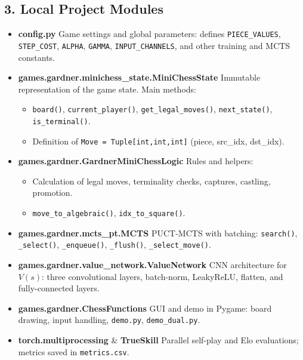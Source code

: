 \documentclass{report}
\begin{document}
\subsection*{3. Local Project Modules}
\begin{itemize}
  \item \textbf{config.py}  
    Game settings and global parameters: defines \texttt{PIECE\_VALUES}, \texttt{STEP\_COST}, \texttt{ALPHA}, \texttt{GAMMA}, \texttt{INPUT\_CHANNELS}, and other training and MCTS constants.

  \item \textbf{games.gardner.minichess\_state.MiniChessState}  
    Immutable representation of the game state. Main methods:
    \begin{itemize}
      \item \texttt{board()}, \texttt{current\_player()}, \texttt{get\_legal\_moves()}, \texttt{next\_state()}, \texttt{is\_terminal()}.
      \item Definition of \texttt{Move = Tuple[int,int,int]} (piece, src\_idx, dst\_idx).
    \end{itemize}

  \item \textbf{games.gardner.GardnerMiniChessLogic}  
    Rules and helpers:
    \begin{itemize}
      \item Calculation of legal moves, terminality checks, captures, castling, promotion.
      \item \texttt{move\_to\_algebraic()}, \texttt{idx\_to\_square()}.
    \end{itemize}

  \item \textbf{games.gardner.mcts\_pt.MCTS}  
    PUCT-MCTS with batching: \texttt{search()}, \texttt{\_select()}, \texttt{\_enqueue()}, \texttt{\_flush()}, \texttt{\_select\_move()}.

  \item \textbf{games.gardner.value\_network.ValueNetwork}  
    CNN architecture for $V(s)$: three convolutional layers, batch-norm, LeakyReLU, flatten, and fully-connected layers.

  \item \textbf{games.gardner.ChessFunctions}  
    GUI and demo in Pygame: board drawing, input handling, \texttt{demo.py}, \texttt{demo\_dual.py}.

  \item \textbf{torch.multiprocessing} \& \textbf{TrueSkill}  
    Parallel self-play and Elo evaluations; metrics saved in \texttt{metrics.csv}.
\end{itemize}
\end{document}
